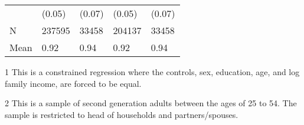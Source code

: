 \begin{table}[!h]
{\begin{threeparttable}
\begin{tabular}[c]{lllll}
 & (0.05) & (0.07) & (0.05) & (0.07)\\
\addlinespace
N & 237595 & 33458 & 204137 & 33458\\
Mean & 0.92 & 0.94 & 0.92 & 0.94\\
\midrule
\bottomrule
\end{tabular}
\begin{tablenotes}
\item[1] This is a constrained regression where the controls, sex, education, age, and log family income, are forced to be equal.
\item[2] This is a sample of second generation adults between the ages of 25 to 54. The sample is restricted to head of households and partners/spouses.
\end{tablenotes}
\end{threeparttable}}
\end{table}
